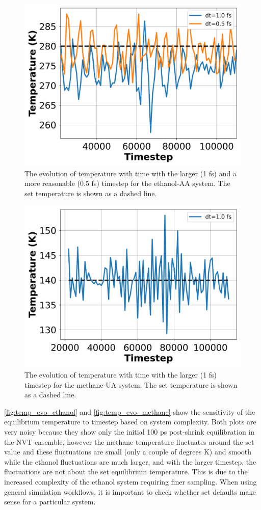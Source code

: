 \begin{figure}[h!]
    \centering
    \includegraphics[width=0.8\linewidth,keepaspectratio]{figures/rep_study/temp_evolution.png}
    \caption{The evolution of temperature with time with the larger (1 fs) and a more reasonable (0.5 fs) timestep for the ethanol-AA system. The set temperature is shown as a dashed line. }\label{fig:temp_evo_ethanol}
\end{figure}
\begin{figure}[h!]
    \centering
    \includegraphics[width=0.8\linewidth,keepaspectratio]{figures/rep_study/temp_evolution_methane.png}
    \caption{The evolution of temperature with time with the larger (1 fs) timestep for the methane-UA system. The set temperature is shown as a dashed line.}\label{fig:temp_evo_methane}
\end{figure}
\autoref{fig:temp_evo_ethanol} and \autoref{fig:temp_evo_methane} show the sensitivity of the equilibrium temperature to timestep based on system complexity. 
Both plots are very noisy because they show only the initial 100 ps post-shrink equilibration in the NVT ensemble, however the methane temperature fluctuates around the set value and these fluctuations are small (only a couple of degrees K) and smooth while the ethanol fluctuations are much larger, and with the larger timestep, the fluctuations are not about the set equilibrium temperature.
This is due to the increased complexity of the ethanol system requiring finer sampling.
When using general simulation workflows, it is important to check whether set defaults make sense for a particular system.

